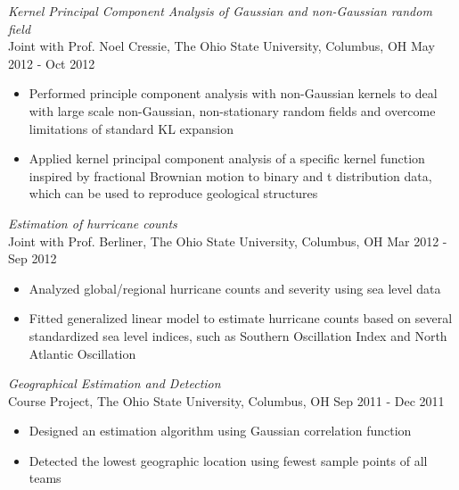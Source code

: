 \documentclass[10pt]{res} %
\begin{document}
\begin{resume}
 {\sl Kernel Principal Component Analysis of Gaussian and
     non-Gaussian random field} \\
Joint with Prof. Noel Cressie, The Ohio State University, Columbus, OH \hfill May 2012 - Oct 2012
 \begin{itemize} \itemsep -2pt  %
\item Performed principle component analysis with non-Gaussian kernels
  to deal with large scale non-Gaussian, non-stationary random fields and overcome limitations of standard KL expansion
\item Applied kernel principal component analysis of a specific kernel
  function inspired by fractional Brownian motion to binary and t
  distribution data, which can be used to reproduce geological structures
 \end{itemize}

{\sl Estimation of hurricane counts} \\
Joint with Prof. Berliner, The Ohio State University, Columbus, OH
\hfill Mar 2012 - Sep 2012
\begin{itemize} \itemsep -2pt
\item Analyzed global/regional hurricane counts and severity using sea level data
\item Fitted generalized linear model to estimate hurricane counts based on several standardized sea level indices, such as Southern Oscillation Index and North Atlantic Oscillation
\end{itemize}

{\sl Geographical Estimation and Detection} \\
Course Project, The Ohio State University, Columbus, OH \hfill Sep 2011 - Dec 2011
\begin{itemize} \itemsep -2pt
\item Designed an estimation algorithm using Gaussian correlation function
\item Detected the lowest geographic location using fewest sample
  points of all teams
\end{itemize}




\end{resume}
\end{document}
